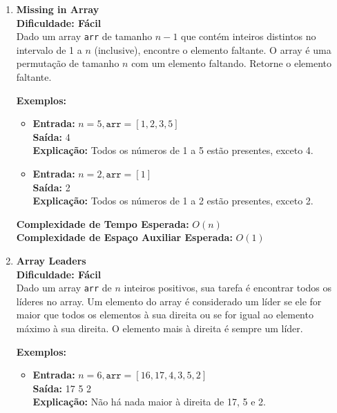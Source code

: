 \documentclass[a4paper,12pt]{article}
\begin{document}
\begin{enumerate}

    \item \textbf{Missing in Array} \\
    \textbf{Dificuldade: Fácil} \\
    Dado um array \texttt{arr} de tamanho \( n-1 \) que contém inteiros distintos no intervalo de 1 a \( n \) (inclusive), encontre o elemento faltante. O array é uma permutação de tamanho \( n \) com um elemento faltando. Retorne o elemento faltante.

    \textbf{Exemplos:}
    \begin{itemize}
        \item \textbf{Entrada:} \( n = 5, \texttt{arr} = [1,2,3,5] \) \\
        \textbf{Saída:} 4 \\
        \textbf{Explicação:} Todos os números de 1 a 5 estão presentes, exceto 4.
        
        \item \textbf{Entrada:} \( n = 2, \texttt{arr} = [1] \) \\
        \textbf{Saída:} 2 \\
        \textbf{Explicação:} Todos os números de 1 a 2 estão presentes, exceto 2.
    \end{itemize}
    
    \textbf{Complexidade de Tempo Esperada:} \( O(n) \) \\
    \textbf{Complexidade de Espaço Auxiliar Esperada:} \( O(1) \)

    \item \textbf{Array Leaders} \\
    \textbf{Dificuldade: Fácil} \\
    Dado um array \texttt{arr} de \( n \) inteiros positivos, sua tarefa é encontrar todos os líderes no array. Um elemento do array é considerado um líder se ele for maior que todos os elementos à sua direita ou se for igual ao elemento máximo à sua direita. O elemento mais à direita é sempre um líder.

    \textbf{Exemplos:}
    \begin{itemize}
        \item \textbf{Entrada:} \( n = 6, \texttt{arr} = [16,17,4,3,5,2] \) \\
        \textbf{Saída:} 17 5 2 \\
        \textbf{Explicação:} Não há nada maior à direita de 17, 5 e 2.
        

\end{itemize}
\end{enumerate}
\end{document}
